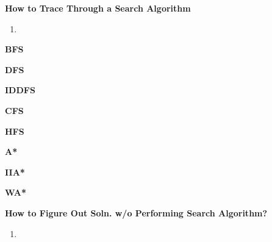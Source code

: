 \begin{example}
    
\end{example}
\newpage

\begin{process} \textbf{How to Trace Through a Search Algorithm}
    \begin{enumerate}
        \item 
    \end{enumerate}
\end{process}

\begin{example} \textbf{BFS}
    
\end{example}

\begin{example} \textbf{DFS}
    
\end{example}

\begin{example} \textbf{IDDFS}

\end{example}

\begin{example} \textbf{CFS}

\end{example}

\begin{example} \textbf{HFS}
    
\end{example}

\begin{example} \textbf{A*}

\end{example}

\begin{example} \textbf{IIA*}
    
\end{example}

\begin{example} \textbf{WA*}
    
\end{example}
\newpage

\begin{process} \textbf{How to Figure Out Soln. w/o Performing Search Algorithm?}
    \begin{enumerate}
        \item 
    \end{enumerate}
\end{process}


